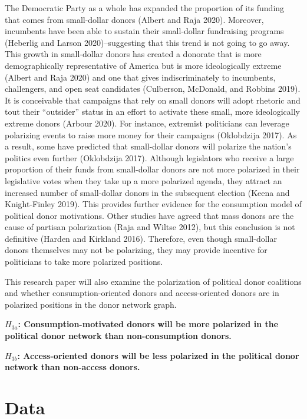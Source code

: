 \documentclass[12pt,]{article}
\begin{document}
The Democratic Party as a whole has expanded the proportion of its
funding that comes from small-dollar donors (Albert and Raja 2020).
Moreover, incumbents have been able to sustain their small-dollar
fundraising programs (Heberlig and Larson 2020)--suggesting that this
trend is not going to go away. This growth in small-dollar donors has
created a donorate that is more demographically representative of
America but is more ideologically extreme (Albert and Raja 2020) and one
that gives indiscriminately to incumbents, challengers, and open seat
candidates (Culberson, McDonald, and Robbins 2019). It is conceivable
that campaigns that rely on small donors will adopt rhetoric and tout
their ``outsider'' status in an effort to activate these small, more
ideologically extreme donors (Arbour 2020). For instance, extremist
politicians can leverage polarizing events to raise more money for their
campaigns (Oklobdzija 2017). As a result, some have predicted that
small-dollar donors will polarize the nation's politics even further
(Oklobdzija 2017). Although legislators who receive a large proportion
of their funds from small-dollar donors are not more polarized in their
legislative votes when they take up a more polarized agenda, they
attract an increased number of small-dollar donors in the subsequent
election (Keena and Knight-Finley 2019). This provides further evidence
for the consumption model of political donor motivations. Other studies
have agreed that mass donors are the cause of partisan polarization
(Raja and Wiltse 2012), but this conclusion is not definitive (Harden
and Kirkland 2016). Therefore, even though small-dollar donors
themselves may not be polarizing, they may provide incentive for
politicians to take more polarized positions.

This research paper will also examine the polarization of political
donor coalitions and whether consumption-oriented donors and
access-oriented donors are in polarized positions in the donor network
graph.

\textbf{\(H_{3a}\): Consumption-motivated donors will be more polarized
in the political donor network than non-consumption donors.}

\textbf{\(H_{3b}\): Access-oriented donors will be less polarized in the
political donor network than non-access donors.}

\hypertarget{data}{%
\section{Data}\label{data}}
\end{document}
